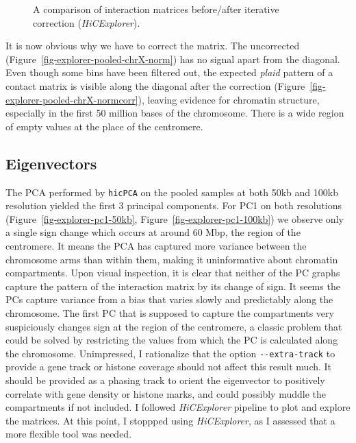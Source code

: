\documentclass[
  11pt,
  a4paper,
]{scrbook}
\let\oldemph\emph
\renewcommand\emph[1]{\oldemph{\color{gray}#1}}
\begin{document}
\begin{figure}
\begin{minipage}{0.50\linewidth}
{}


\end{minipage}%

\caption{\label{fig-explorer-pooled-norm-normcorr}A comparison of
interaction matrices before/after iterative correction
(\emph{HiCExplorer}).}

\end{figure}%

It is now obvious why we have to correct the matrix. The uncorrected
(Figure~\ref{fig-explorer-pooled-chrX-norm}) has no signal apart from
the diagonal. Even though some bins have been filtered out, the expected
\emph{plaid} pattern of a contact matrix is visible along the diagonal
after the correction (Figure~\ref{fig-explorer-pooled-chrX-normcorr}),
leaving evidence for chromatin structure, especially in the first 50
million bases of the chromosome. There is a wide region of empty values
at the place of the centromere.

\subsection{Eigenvectors}\label{eigenvectors}

The PCA performed by \texttt{hicPCA} on the pooled samples at both 50kb
and 100kb resolution yielded the first 3 principal components. For PC1
on both resolutions (Figure~\ref{fig-explorer-pc1-50kb},
Figure~\ref{fig-explorer-pc1-100kb}) we observe only a single sign
change which occurs at around 60 Mbp, the region of the centromere. It
means the PCA has captured more variance between the chromosome arms
than within them, making it uninformative about chromatin compartments.
Upon visual inspection, it is clear that neither of the PC graphs
capture the pattern of the interaction matrix by its change of sign. It
seems the PCs capture variance from a bias that varies slowly and
predictably along the chromosome. The first PC that is supposed to
capture the compartments very suspiciously changes sign at the region of
the centromere, a classic problem that could be solved by restricting
the values from which the PC is calculated along the chromosome.
Unimpressed, I rationalize that the option \texttt{-\/-extra-track} to
provide a gene track or histone coverage should not affect this result
much. It should be provided as a phasing track to orient the eigenvector
to positively correlate with gene density or histone marks, and could
possibly muddle the compartments if not included. I followed
\emph{HiCExplorer} pipeline to plot and explore the matrices. At this
point, I stoppped using \emph{HiCExplorer}, as I assessed that a more
flexible tool was needed.
\end{document}
